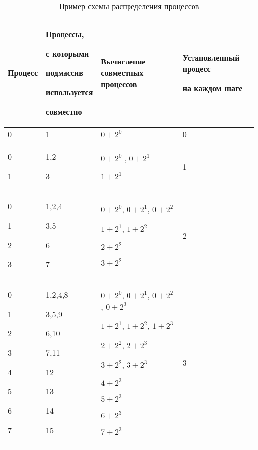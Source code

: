 \documentclass{report}
\begin{document}
\begin{table}[h]
\centering
    \begin{tabular}{ | p{2cm} | p{4cm} | p{6cm} | p{4cm} | }
    \hline
    Процесс & Процессы, \par с которыми \par подмассив \par используется \par совместно & Вычисление совместных процессов & Установленный процесс \par на каждом шаге \\ \hline
    0 & 1 & $0 + 2^0$ & 0 \\ \hline 
    0 \par 1 & 1,2 \par 3 & $0 + 2^0$ , $0 + 2^1$ \par $1 + 2^1$ & 1  \\ \hline
    0 \par 1 \par 2 \par 3 & 1,2,4 \par 3,5 \par 6 \par 7 & $0 + 2^0$, $0 + 2^1$, $0 + 2^2$ \par $1 + 2^1$, $1 + 2^2$ \par $2 + 2^2$ \par $3 + 2^2$ & 2 \\ \hline
    0 \par 1 \par 2 \par 3 \par 4 \par 5 \par 6 \par 7 & 1,2,4,8 \par 3,5,9 \par 6,10 \par 7,11 \par 12 \par 13 \par 14 \par 15 & $0 + 2^0$, $0 + 2^1$, $0 + 2^2$, $0 + 2^3$ \par $1 + 2^1$, $1 + 2^2$, $1 + 2^3$ \par $2 + 2^2$, $2 + 2^3$ \par $3 + 2^2$, $3 + 2^3$ \par $4 + 2^3$ \par $5 + 2^3$ \par $6 + 2^3$ \par $7 + 2^3$ & 3 \\ \hline
    \end{tabular}
    \caption{Пример схемы распределения процессов}
\end{table}
\newpage
\end{document}
